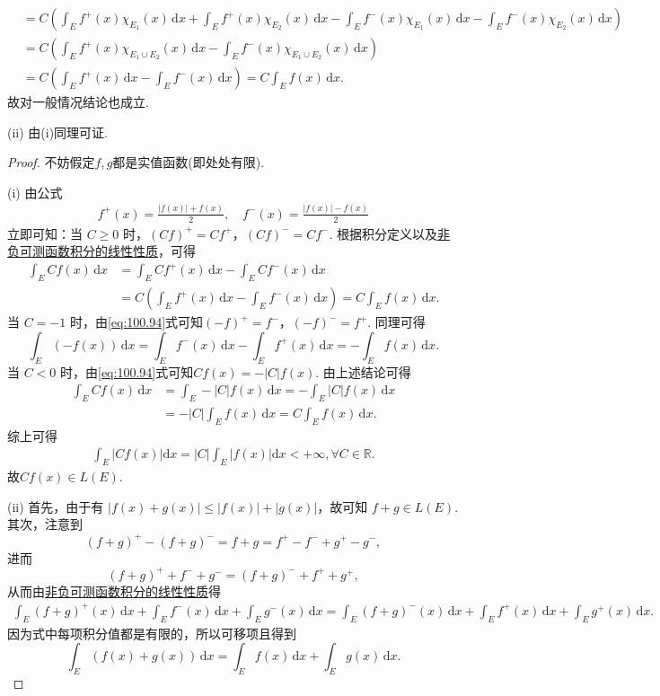 \documentclass[../../main.tex]{subfiles}%
\begin{document}
\begin{remark}
\begin{align*}
&= C \left( \int_E f^+(x) \chi_{E_1}(x) \, \mathrm{d}x + \int_E f^+(x) \chi_{E_2}(x) \, \mathrm{d}x - \int_E f^-(x) \chi_{E_1}(x) \, \mathrm{d}x - \int_E f^-(x) \chi_{E_2}(x) \, \mathrm{d}x \right) \\
&= C \left( \int_E f^+(x) \chi_{E_1 \cup E_2}(x) \, \mathrm{d}x - \int_E f^-(x) \chi_{E_1 \cup E_2}(x) \, \mathrm{d}x \right) \\
&= C \left( \int_E f^+(x) \, \mathrm{d}x - \int_E f^-(x) \, \mathrm{d}x \right) = C \int_E f(x) \, \mathrm{d}x.
\end{align*}
故对一般情况结论也成立.

(ii) 由(i)同理可证.
\end{remark}
\begin{proof}
不妨假定$f,g$都是实值函数(即处处有限).

(i) 由公式
\begin{align}\label{eq:100.94}
f^+(x) = \frac{|f(x)| + f(x)}{2}, \quad f^-(x) = \frac{|f(x)| - f(x)}{2}
\end{align}
立即可知：当 \( C \geqslant  0 \) 时，\( (Cf)^+ = Cf^+ \)，\( (Cf)^- = Cf^- \). 根据积分定义以及\hyperref[theorem:非负可测函数积分的线性性质]{非负可测函数积分的线性性质}，可得
\begin{align*}
\int_E Cf(x) \, \mathrm{d}x &= \int_E Cf^+(x) \, \mathrm{d}x - \int_E Cf^-(x) \, \mathrm{d}x \\
&= C \left( \int_E f^+(x) \, \mathrm{d}x - \int_E f^-(x) \, \mathrm{d}x \right) = C \int_E f(x) \, \mathrm{d}x.
\end{align*}
当 \( C = -1 \) 时，由\eqref{eq:100.94}式可知\( (-f)^+ = f^- \)，\( (-f)^- = f^+ \). 同理可得
\[
\int_E (-f(x)) \, \mathrm{d}x = \int_E f^-(x) \, \mathrm{d}x - \int_E f^+(x) \, \mathrm{d}x = - \int_E f(x) \, \mathrm{d}x.
\]
当 \( C < 0 \) 时，由\eqref{eq:100.94}式可知\( Cf(x) = -|C|f(x) \). 由上述结论可得
\begin{align*}
\int_E Cf(x) \, \mathrm{d}x &= \int_E -|C| f(x) \, \mathrm{d}x = - \int_E |C|f(x) \, \mathrm{d}x \\
&= -|C| \int_E f(x) \, \mathrm{d}x = C \int_E f(x) \, \mathrm{d}x.
\end{align*}
综上可得
\begin{align*}
\int_E{\left| Cf\left( x \right) \right|\mathrm{d}x}=\left| C \right|\int_E{\left| f\left( x \right) \right|\mathrm{d}x}<+\infty ,\forall C\in \mathbb{R} .
\end{align*}
故\( Cf(x)\in L(E) \).

(ii) 首先，由于有 \( |f(x) + g(x)| \leqslant  |f(x)| + |g(x)| \)，故可知 \( f + g \in L(E) \). 其次，注意到
\[
(f + g)^+ - (f + g)^- = f + g = f^+ - f^- + g^+ - g^-,
\]
进而
\[
(f + g)^+ + f^- + g^- = (f + g)^- + f^+ + g^+,
\]
从而由\hyperref[theorem:非负可测函数积分的线性性质]{非负可测函数积分的线性性质}得
\begin{align*}
\int_E (f + g)^+(x) \, \mathrm{d}x + \int_E f^-(x) \, \mathrm{d}x + \int_E g^-(x) \, \mathrm{d}x 
= \int_E (f + g)^-(x) \, \mathrm{d}x + \int_E f^+(x) \, \mathrm{d}x + \int_E g^+(x) \, \mathrm{d}x.
\end{align*}
因为式中每项积分值都是有限的，所以可移项且得到
\[
\int_E (f(x) + g(x)) \, \mathrm{d}x = \int_E f(x) \, \mathrm{d}x + \int_E g(x) \, \mathrm{d}x.
\]


\end{proof}
\end{document}
